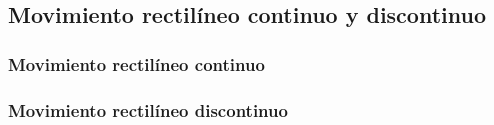 \subsection*{Movimiento rectilíneo continuo y discontinuo}
\subsubsection*{Movimiento rectilíneo continuo}
\subsubsection*{Movimiento rectilíneo discontinuo}